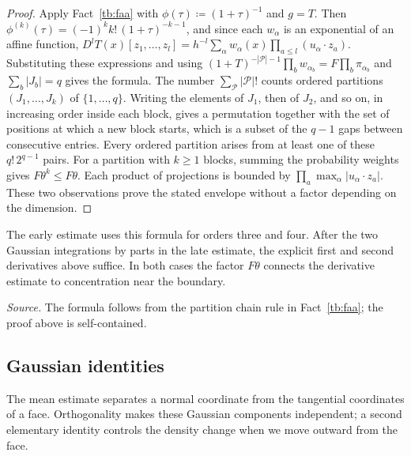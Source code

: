\documentclass[11pt,letterpaper]{article}
\theoremstyle{plain}
\begin{document}
\begin{proof}
Apply Fact~\ref{tb:faa} with \(\phi(\tau)\coloneqq (1+\tau)^{-1}\) and \(g=T\). Then
\(\phi^{(k)}(\tau)=(-1)^kk!\,(1+\tau)^{-k-1}\), and since each \(w_\alpha\) is
an exponential of an affine function,
\(D^lT(x)[z_1,\ldots,z_l]=h^{-l}\sum_\alpha w_\alpha(x)\prod_{a\le l}
(u_\alpha\cdot z_a)\). Substituting these expressions and using
\((1+T)^{-|\mathcal P|-1}\prod_bw_{\alpha_b}=F\prod_b\pi_{\alpha_b}\) and
\(\sum_b|J_b|=q\) gives the formula. The number
\(\sum_{\mathcal P}|\mathcal P|!\) counts ordered partitions
\((J_1,\ldots,J_k)\) of \(\{1,\ldots,q\}\). Writing the elements of
\(J_1\), then of \(J_2\), and so on, in increasing order inside each block,
gives a permutation together with the set of positions at which a new block
starts, which is a subset of the \(q-1\) gaps between consecutive entries.
Every ordered partition arises from at least one of these
\(q!\,2^{q-1}\) pairs. For a partition with \(k\ge1\) blocks, summing the probability
weights gives \(F\theta^k\le F\theta\). Each product of projections
is bounded by \(\prod_a\max_\alpha|u_\alpha\cdot z_a|\).
These two observations prove the stated envelope without a factor
depending on the dimension.
\end{proof}

The early estimate uses this formula for orders three and four. After
the two Gaussian integrations by parts in the late estimate, the explicit
first and second derivatives above suffice. In both cases the factor
\(F\theta\) connects the derivative estimate to concentration near
the boundary.

\emph{Source.} The formula follows from the partition chain rule in
Fact~\ref{tb:faa}; the proof above is self-contained.

\subsection{Gaussian identities}\label{tb:sec:gauss}

The mean estimate separates a normal coordinate from the tangential
coordinates of a face. Orthogonality makes these Gaussian components
independent; a second elementary identity controls the density change
when we move outward from the face.
\end{document}
